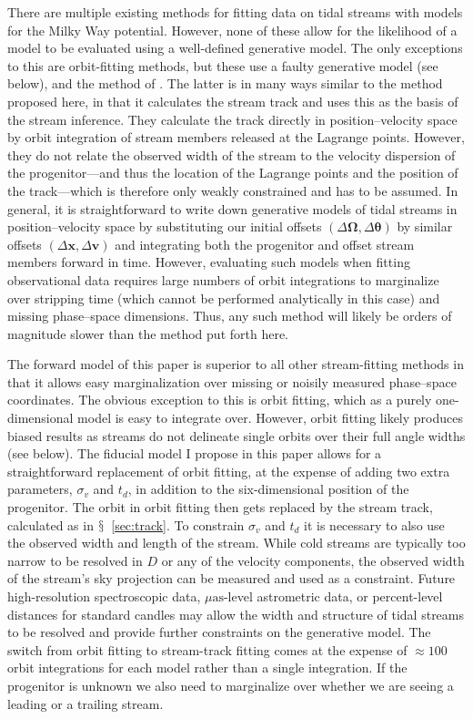 \documentclass[12pt,preprint]{aastex}
\newcommand{\sectionname}{$\mathsection$}
\renewcommand{\vec}[1]{\ensuremath{\mathbf{#1}}}
\newcommand{\vecx}{\ensuremath{\vec{x}}}
\newcommand{\vecv}{\ensuremath{\vec{v}}}
\newcommand{\veco}{\ensuremath{\vec{\Omega}}}
\newcommand{\veca}{\ensuremath{\boldsymbol\theta}}
\newcommand{\sigv}{\ensuremath{\sigma_v}}
\begin{document}
There are multiple existing methods for fitting data on tidal streams
with models for the Milky Way potential. However, none of these allow
for the likelihood of a model to be evaluated using a well-defined
generative model. The only exceptions to this are orbit-fitting
methods, but these use a faulty generative model (see below), and the
method of \citet{Varghese11a}. The latter is in many ways similar to
the method proposed here, in that it calculates the stream track and
uses this as the basis of the stream inference. They calculate the
track directly in position--velocity space by orbit integration of
stream members released at the Lagrange points. However, they do not
relate the observed width of the stream to the velocity dispersion of
the progenitor---and thus the location of the Lagrange points and the
position of the track---which is therefore only weakly constrained and
has to be assumed. In general, it is straightforward to write down
generative models of tidal streams in position--velocity space by
substituting our initial offsets $(\Delta \veco,\Delta \veca)$ by
similar offsets $(\Delta \vecx,\Delta \vecv)$ and integrating both the
progenitor and offset stream members forward in time. However,
evaluating such models when fitting observational data requires large
numbers of orbit integrations to marginalize over stripping time
(which cannot be performed analytically in this case) and missing
phase--space dimensions. Thus, any such method will likely be orders
of magnitude slower than the method put forth here.

The forward model of this paper is superior to all other
stream-fitting methods in that it allows easy marginalization over
missing or noisily measured phase--space coordinates. The obvious
exception to this is orbit fitting, which as a purely one-dimensional
model is easy to integrate over. However, orbit fitting likely
produces biased results as streams do not delineate single orbits over
their full angle widths (see below). The fiducial model I propose in
this paper allows for a straightforward replacement of orbit fitting,
at the expense of adding two extra parameters, $\sigv$ and $t_d$, in
addition to the six-dimensional position of the progenitor. The orbit
in orbit fitting then gets replaced by the stream track, calculated as
in \sectionname~\ref{sec:track}. To constrain $\sigv$ and $t_d$ it is
necessary to also use the observed width and length of the
stream. While cold streams are typically too narrow to be resolved in
$D$ or any of the velocity components, the observed width of the
stream's sky projection can be measured and used as a
constraint. Future high-resolution spectroscopic data,
$\mu\mathrm{as}$-level astrometric data, or percent-level distances
for standard candles may allow the width and structure of tidal
streams to be resolved and provide further constraints on the
generative model. The switch from orbit fitting to stream-track
fitting comes at the expense of $\approx100$ orbit integrations for
each model rather than a single integration. If the progenitor is
unknown we also need to marginalize over whether we are seeing a
leading or a trailing stream.
\end{document}
